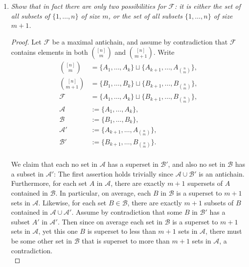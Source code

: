 \documentclass{article}
\begin{document}
\begin{enumerate}
\begin{enumerate}
      \item \it Show that in fact there are only two possibilities for
        $\mathcal{F}$: it is either the set of all subsets of
        $\{1,\ldots,n\}$ of size $m$, or the set of all subsets
        $\{1,\ldots,n\}$ of size $m+1$.

        \begin{proof}
          Let $\mathcal{F}$ be a maximal antichain, and assume by
          contradiction that $\mathcal{F}$ contains elements in both
          $\binom{[n]}{m}$ and $\binom{[n]}{m+1}$. Write
          \begin{align*}
            \binom{[n]}{m} &=\{A_1,\ldots,A_k\} \sqcup
              \{A_{k+1},\ldots,A_{\binom{n}{m}}\},\\
            \binom{[n]}{m+1} &=\{B_1,\ldots,B_k\} \sqcup
              \{B_{k+1},\ldots,B_{\binom{n}{m}}\},\\
            \mathcal{F} &=\{A_1,\ldots,A_k\} \sqcup
              \{B_{k+1},\ldots,B_{\binom{n}{m}}\},\\
            \mathcal{A} &:=\{A_1,\ldots,A_k\},\\
            \mathcal{B} &:=\{B_1,\ldots,B_k\},\\
            \mathcal{A}' &:=\{A_{k+1},\ldots,A_{\binom{n}{m}}\},\\
            \mathcal{B}' &:=\{B_{k+1},\ldots,B_{\binom{n}{m}}\}.\\
          \end{align*}

          We claim that each no set in $\mathcal{A}$ has a superset in
          $\mathcal{B}'$, and also no set in $\mathcal{B}$ has a subset in
          $\mathcal{A}'$: The first assertion holds trivially since
          $\mathcal{A}\cup\mathcal{B}'$ is an antichain. Furthermore, for
          each set $A$ in $\mathcal{A}$, there are exactly $m+1$ supersets
          of $A$ contained in $\mathcal{B}$. In particular, on average,
          each $B$ in $\mathcal{B}$ is a superset to $m+1$ sets in
          $\mathcal{A}$. Likewise, for each set $B\in\mathcal{B}$, there
          are exactly $m+1$ subsets of $B$ contained in
          $\mathcal{A}\cup\mathcal{A}'$. Assume by contradiction that some
          $B$ in $\mathcal{B}'$ has a subset $A'$ in $\mathcal{A}'$. Then
          since on average each set in $\mathcal{B}$ is a superset to $m+1$
          sets in $\mathcal{A}$, yet this one $B$ is superset to less
          than $m+1$ sets in $\mathcal{A}$, there must be some other set in
          $\mathcal{B}$ that is superset to more than $m+1$ sets in
          $\mathcal{A}$, a contradiction. \\


\end{proof}
\end{enumerate}
\end{enumerate}
\end{document}
